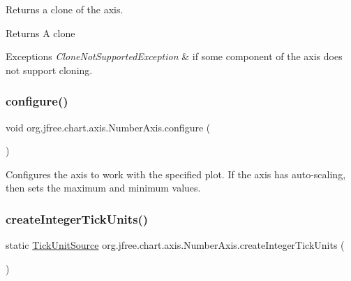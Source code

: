 Returns a clone of the axis.

\begin{DoxyReturn}{Returns}
A clone
\end{DoxyReturn}

\begin{DoxyExceptions}{Exceptions}
{\em Clone\+Not\+Supported\+Exception} & if some component of the axis does not support cloning. \\
\hline
\end{DoxyExceptions}
\mbox{\label{classorg_1_1jfree_1_1chart_1_1axis_1_1_number_axis_a9ce5dc230912397f2eb7a52803aced73}} 
\subsubsection{\texorpdfstring{configure()}{configure()}}
{\footnotesize\ttfamily void org.\+jfree.\+chart.\+axis.\+Number\+Axis.\+configure (\begin{DoxyParamCaption}{ }\end{DoxyParamCaption})}

Configures the axis to work with the specified plot. If the axis has auto-\/scaling, then sets the maximum and minimum values. \mbox{\label{classorg_1_1jfree_1_1chart_1_1axis_1_1_number_axis_adc561730bb342bdaf2c59d8bd5897718}} 
\subsubsection{\texorpdfstring{create\+Integer\+Tick\+Units()}{createIntegerTickUnits()}\hspace{0.1cm}{\footnotesize\ttfamily [1/2]}}
{\footnotesize\ttfamily static \mbox{\hyperlink{interfaceorg_1_1jfree_1_1chart_1_1axis_1_1_tick_unit_source}{Tick\+Unit\+Source}} org.\+jfree.\+chart.\+axis.\+Number\+Axis.\+create\+Integer\+Tick\+Units (\begin{DoxyParamCaption}{ }\end{DoxyParamCaption})\hspace{0.3cm}{\ttfamily [static]}}

